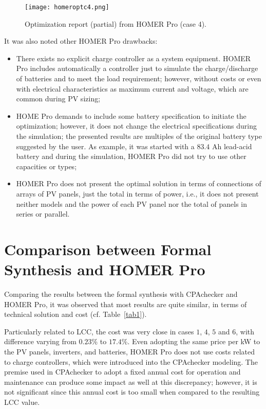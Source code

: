 \begin{figure}[h]
\texttt{[image: homeroptc4.png]}
\centering
\caption{Optimization report (partial) from HOMER Pro (case 4).}
\label{fig:homeroptc4}
\end{figure}

It was also noted other HOMER Pro drawbacks:

\begin{itemize}
\item There exists no explicit charge controller 
as a system equipment. HOMER Pro includes automatically 
a controller just to simulate the charge/discharge 
of batteries and to meet the load requirement; however, 
without costs or even with electrical characteristics 
as maximum current and voltage, which are common during PV sizing;
\item HOME Pro demands to include some battery specification 
to initiate the optimization; however, it does not change 
the electrical specifications during the simulation; 
the presented results are multiples of the original 
battery type suggested by the user. As example, it was 
started with a $83.4$ Ah lead-acid battery and during 
the simulation, HOMER Pro did not try to use other capacities or types;
\item HOMER Pro does not present the optimal solution 
in terms of connections of arrays of PV panels, just the 
total in terms of power, i.e., it does not present neither models 
and the power of each PV panel nor the total of panels in series or parallel. 
\end{itemize}

\section{Comparison between Formal Synthesis and HOMER Pro}

Comparing the results between the formal synthesis with CPAchecker 
and HOMER Pro, it was observed that most results are quite similar, 
in terms of technical solution and cost (cf. Table~\ref{tab1}). 

Particularly related to LCC, the cost was very close in cases 
$1$, $4$, $5$ and $6$, with difference varying from $0.23$\% to $17.4$\%. 
Even adopting the same price per kW to the PV panels, 
inverters, and batteries, HOMER Pro does not use costs 
related to charge controllers, which were introduced into the 
CPAchecker modeling. The premise used in CPAchecker to adopt 
a fixed annual cost for operation and maintenance can produce 
some impact as well at this discrepancy; however, it is not significant
since this annual cost is too small when compared to the resulting LCC value.

